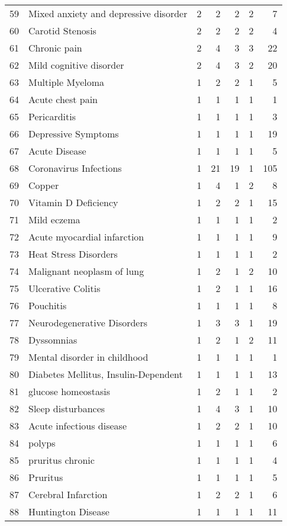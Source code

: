 \begin{tabular}{llrrrrr}
59 & Mixed anxiety and depressive disorder & 2 & 2 & 2 & 2 & 7 \\
60 & Carotid Stenosis & 2 & 2 & 2 & 2 & 4 \\
61 & Chronic pain & 2 & 4 & 3 & 3 & 22 \\
62 & Mild cognitive disorder & 2 & 4 & 3 & 2 & 20 \\
63 & Multiple Myeloma & 1 & 2 & 2 & 1 & 5 \\
64 & Acute chest pain & 1 & 1 & 1 & 1 & 1 \\
65 & Pericarditis & 1 & 1 & 1 & 1 & 3 \\
66 & Depressive Symptoms & 1 & 1 & 1 & 1 & 19 \\
67 & Acute Disease & 1 & 1 & 1 & 1 & 5 \\
68 & Coronavirus Infections & 1 & 21 & 19 & 1 & 105 \\
69 & Copper & 1 & 4 & 1 & 2 & 8 \\
70 & Vitamin D Deficiency & 1 & 2 & 2 & 1 & 15 \\
71 & Mild eczema & 1 & 1 & 1 & 1 & 2 \\
72 & Acute myocardial infarction & 1 & 1 & 1 & 1 & 9 \\
73 & Heat Stress Disorders & 1 & 1 & 1 & 1 & 2 \\
74 & Malignant neoplasm of lung & 1 & 2 & 1 & 2 & 10 \\
75 & Ulcerative Colitis & 1 & 2 & 1 & 1 & 16 \\
76 & Pouchitis & 1 & 1 & 1 & 1 & 8 \\
77 & Neurodegenerative Disorders & 1 & 3 & 3 & 1 & 19 \\
78 & Dyssomnias & 1 & 2 & 1 & 2 & 11 \\
79 & Mental disorder in childhood & 1 & 1 & 1 & 1 & 1 \\
80 & Diabetes Mellitus, Insulin-Dependent & 1 & 1 & 1 & 1 & 13 \\
81 & glucose homeostasis & 1 & 2 & 1 & 1 & 2 \\
82 & Sleep disturbances & 1 & 4 & 3 & 1 & 10 \\
83 & Acute infectious disease & 1 & 2 & 2 & 1 & 10 \\
84 & polyps & 1 & 1 & 1 & 1 & 6 \\
85 & pruritus chronic & 1 & 1 & 1 & 1 & 4 \\
86 & Pruritus & 1 & 1 & 1 & 1 & 5 \\
87 & Cerebral Infarction & 1 & 2 & 2 & 1 & 6 \\
88 & Huntington Disease & 1 & 1 & 1 & 1 & 11 \\

\end{tabular}
